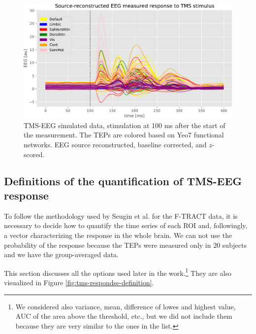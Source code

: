 \begin{figure}
    \centering
    \includegraphics[width=\textwidth]{images/nootebook_generated/pytepfit_results/simulated/200/not_over_threshold_nan/data.pdf}
    \caption[TMS-EEG simulated data]{TMS-EEG simulated data, stimulation at 100 ms after the start of the measurement. The TEPs are colored based on Yeo7 functional networks. EEG source reconstructed, baseline corrected, and $z$-scored.}
    \label{fig:tms-simulated-data}
\end{figure}

\subsection{Definitions of the quantification of TMS-EEG response}

To follow the methodology used by Seugin et al. for the F-TRACT data, it is necessary to decide how to quantify the time series of each ROI and, followingly, a vector characterizing the response in the whole brain. We can not use the probability of the response because the TEPs were measured only in 20 subjects and we have the group-averaged data.

This section discusses all the options used later in the work.\footnote{We considered also variance, mean, difference of lowes and highest value, AUC of the area above the threshold, etc., but we did not include them because they are very similar to the ones in the list.} They are also visualized in Figure \ref{fig:tms-respondse-definition}.

